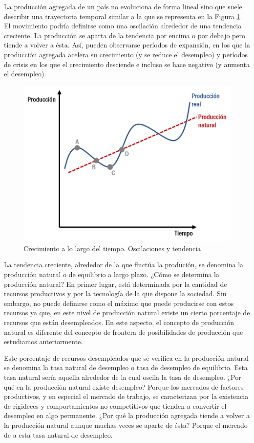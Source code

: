 \documentclass[
]{krantz}
\begin{document}
La producción agregada de un país no evoluciona de forma lineal sino que suele describir una trayectoria temporal similar a la que se representa en la Figura \ref{fig:16a-01}. El movimiento podría deﬁnirse como una oscilación alrededor de una tendencia creciente. La producción se aparta de la tendencia por encima o por debajo pero tiende a volver a ésta. Así, pueden observarse períodos de expansión, en los que la producción agregada acelera su crecimiento (y se reduce el desempleo) y períodos de crisis en los que el crecimiento desciende e incluso se hace negativo (y aumenta el desempleo).

\begin{figure}
\centering
\includegraphics{images/16a-01.png}
\caption{\label{fig:16a-01}Crecimiento a lo largo del tiempo. Oscilaciones y tendencia}
\end{figure}

La tendencia creciente, alrededor de la que ﬂuctúa la produción, se denomina la producción natural o de equilibrio a largo plazo. ¿Cómo se determina la producción natural? En primer lugar, está determinada por la cantidad de recursos productivos y por la tecnología de la que dispone la sociedad. Sin embargo, no puede deﬁnirse como el máximo que puede producirse con estos recursos ya que, en este nivel de producción natural existe un cierto porcentaje de recursos que están desempleados. En este aspecto, el concepto de producción natural es diferente del concepto de frontera de posibilidades de producción que estudiamos anteriormente.

Este porcentaje de recursos desempleados que se veriﬁca en la producción natural se denomina la tasa natural de desempleo o tasa de desempleo de equilibrio. Esta tasa natural sería aquella alrededor de la cual oscila la tasa de desempleo. ¿Por qué en la producción natural existe desempleo? Porque los mercados de factores productivos, y en especial el mercado de trabajo, se caracterizan por la existencia de rigideces y comportamientos no competitivos que tienden a convertir el desempleo en algo permanente. ¿Por qué la producción agregada tiende a volver a la producción natural aunque muchas veces se aparte de ésta? Porque el mercado de a esta tasa natural de desempleo.
\end{document}
